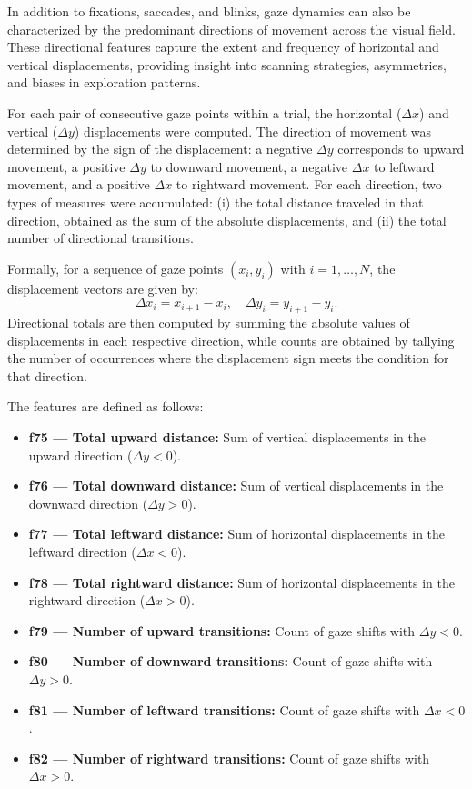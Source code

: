 \documentclass{article}
\begin{document}
In addition to fixations, saccades, and blinks, gaze dynamics can also be characterized by the predominant directions of movement across the visual field. 
These directional features capture the extent and frequency of horizontal and vertical displacements, providing insight into scanning strategies, asymmetries, and biases in exploration patterns.

For each pair of consecutive gaze points within a trial, the horizontal (\(\Delta x\)) and vertical (\(\Delta y\)) displacements were computed. 
The direction of movement was determined by the sign of the displacement: a negative \(\Delta y\) corresponds to upward movement, a positive \(\Delta y\) to downward movement, a negative \(\Delta x\) to leftward movement, and a positive \(\Delta x\) to rightward movement. 
For each direction, two types of measures were accumulated: (i) the total distance traveled in that direction, obtained as the sum of the absolute displacements, and (ii) the total number of directional transitions. 

Formally, for a sequence of gaze points \((x_i, y_i)\) with \(i = 1, \dots, N\), the displacement vectors are given by:
\[
\Delta x_i = x_{i+1} - x_i, \quad \Delta y_i = y_{i+1} - y_i.
\]
Directional totals are then computed by summing the absolute values of displacements in each respective direction, while counts are obtained by tallying the number of occurrences where the displacement sign meets the condition for that direction.

The features are defined as follows:

\begin{itemize}
    \item \textbf{f75 — Total upward distance:} Sum of vertical displacements in the upward direction (\(\Delta y < 0\)).
    \item \textbf{f76 — Total downward distance:} Sum of vertical displacements in the downward direction (\(\Delta y > 0\)).
    \item \textbf{f77 — Total leftward distance:} Sum of horizontal displacements in the leftward direction (\(\Delta x < 0\)).
    \item \textbf{f78 — Total rightward distance:} Sum of horizontal displacements in the rightward direction (\(\Delta x > 0\)).
    \item \textbf{f79 — Number of upward transitions:} Count of gaze shifts with \(\Delta y < 0\).
    \item \textbf{f80 — Number of downward transitions:} Count of gaze shifts with \(\Delta y > 0\).
    \item \textbf{f81 — Number of leftward transitions:} Count of gaze shifts with \(\Delta x < 0\).
    \item \textbf{f82 — Number of rightward transitions:} Count of gaze shifts with \(\Delta x > 0\).
\end{itemize}
\end{document}
